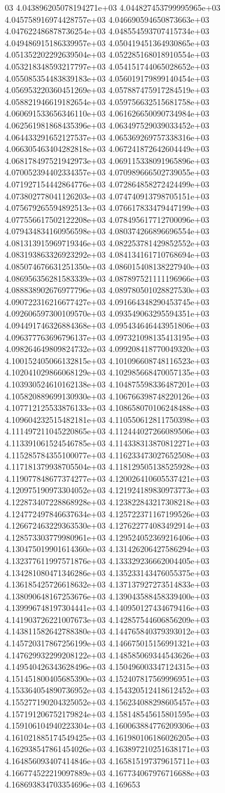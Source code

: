 03	4.043896205078194271e+03	4.044827453799995965e+03	4.045758916974428757e+03	4.046690594650873663e+03	4.047622486878736254e+03	4.048554593707415734e+03	4.049486915186339957e+03	4.050419451364930865e+03	4.051352202292639504e+03	4.052285168018910554e+03	4.053218348593217797e+03	4.054151744065028652e+03	4.055085354483839183e+03	4.056019179899140454e+03	4.056953220360451269e+03	4.057887475917284519e+03	4.058821946619182654e+03	4.059756632515681758e+03	4.060691533656346110e+03	4.061626650090734984e+03	4.062561981868435396e+03	4.063497529039033452e+03	4.064433291652127537e+03	4.065369269757338316e+03	4.066305463404282818e+03	4.067241872642604449e+03	4.068178497521942973e+03	4.069115338091965896e+03	4.070052394402334357e+03	4.070989666502739055e+03	4.071927154442864776e+03	4.072864858272424499e+03	4.073802778041126203e+03	4.074740913798705151e+03	4.075679265594892513e+03	4.076617833479447199e+03	4.077556617502122208e+03	4.078495617712700096e+03	4.079434834160956598e+03	4.080374266896696554e+03	4.081313915969719346e+03	4.082253781429852552e+03	4.083193863326923292e+03	4.084134161710768694e+03	4.085074676631251350e+03	4.086015408138227940e+03	4.086956356281583339e+03	4.087897521111196966e+03	4.088838902676977796e+03	4.089780501028827530e+03	4.090722316216677427e+03	4.091664348290453745e+03	4.092606597300109570e+03	4.093549063295594351e+03	4.094491746326884368e+03	4.095434646443951806e+03	4.096377763696796137e+03	4.097321098135413195e+03	4.098264649809824732e+03	4.099208418770049320e+03	4.100152405066132815e+03	4.101096608748116523e+03	4.102041029866068129e+03	4.102985668470057135e+03	4.103930524610162138e+03	4.104875598336487201e+03	4.105820889699130930e+03	4.106766398748220126e+03	4.107712125533876133e+03	4.108658070106248488e+03	4.109604232515482181e+03	4.110550612811750398e+03	4.111497211045220865e+03	4.112444027266089506e+03	4.113391061524546785e+03	4.114338313870812271e+03	4.115285784355100077e+03	4.116233473027652508e+03	4.117181379938705504e+03	4.118129505138525928e+03	4.119077848677374277e+03	4.120026410605537421e+03	4.120975190973304052e+03	4.121924189830973773e+03	4.122873407228868928e+03	4.123822843217308218e+03	4.124772497846637634e+03	4.125722371167199526e+03	4.126672463229363530e+03	4.127622774083492914e+03	4.128573303779980961e+03	4.129524052369216406e+03	4.130475019901614360e+03	4.131426206427586294e+03	4.132377611997571876e+03	4.133329236662004405e+03	4.134281080471346286e+03	4.135233143476055375e+03	4.136185425726618632e+03	4.137137927273514833e+03	4.138090648167253676e+03	4.139043588458339400e+03	4.139996748197304441e+03	4.140950127434679416e+03	4.141903726221007673e+03	4.142857544606856209e+03	4.143811582642788380e+03	4.144765840379393012e+03	4.145720317867256199e+03	4.146675015156991321e+03	4.147629932299208122e+03	4.148585069344543626e+03	4.149540426343628496e+03	4.150496003347124315e+03	4.151451800405685390e+03	4.152407817569996951e+03	4.153364054890736952e+03	4.154320512418612452e+03	4.155277190204325052e+03	4.156234088298605457e+03	4.157191206752179824e+03	4.158148545615801595e+03	4.159106104940223304e+03	4.160063884776209306e+03	4.161021885174549425e+03	4.161980106186026205e+03	4.162938547861454026e+03	4.163897210251638171e+03	4.164856093407414846e+03	4.165815197379615711e+03	4.166774522219097889e+03	4.167734067976716688e+03	4.168693834703354696e+03	4.169653